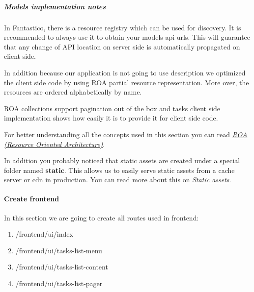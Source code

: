 \documentclass[letterpaper,10pt,english]{sphinxmanual}
\begin{document}
\subparagraph{Models implementation notes}
\label{how_to/todo/step_3_create_frontend:models-implementation-notes}
In Fantastico, there is a resource registry which can be used for discovery. It is recommended to always use it to obtain your
models api urls. This will guarantee that any change of API location on server side is automatically propagated on client side.

In addition because our application is not going to use description we optimized the client side code by using ROA partial resource
representation. More over, the resources are ordered alphabetically by name.

ROA collections support pagination out of the box and tasks client side implementation shows how easily it is to provide it
for client side code.

For better understanding all the concepts used in this section you can read {\hyperref[features/roa::doc]{\emph{ROA (Resource Oriented Architecture)}}}.

In addition you probably noticed that static assets are created under a special folder named \textbf{static}. This allows us to easily
serve static assets from a cache server or cdn in production. You can read more about this on {\hyperref[how_to/static_assets::doc]{\emph{Static assets}}}.


\paragraph{Create frontend}
\label{how_to/todo/step_3_create_frontend:create-frontend}
In this section we are going to create all routes used in frontend:
\begin{enumerate}
\item {} 
/frontend/ui/index

\item {} 
/frontend/ui/tasks-list-menu

\item {} 
/frontend/ui/tasks-list-content

\item {} 
/frontend/ui/tasks-list-pager

\end{enumerate}
\end{document}
